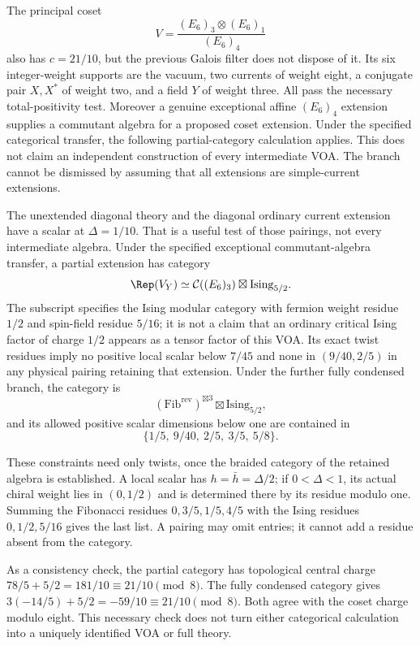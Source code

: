 The principal coset
\[
 V=\frac{(E_6)_3\otimes(E_6)_1}{(E_6)_4}
\]
also has $c=21/10$, but the previous Galois filter does not
dispose of it. Its six integer-weight supports are the vacuum,
two currents of weight eight, a conjugate pair $X,X^*$ of
weight two, and a field $Y$ of weight three. All pass the necessary
total-positivity test. Moreover a genuine exceptional affine
$(E_6)_4$ extension supplies a commutant algebra for a proposed
coset extension. Under the specified categorical transfer, the
following partial-category calculation applies. This does not
claim an independent construction of every intermediate VOA.
The branch cannot be dismissed by
assuming that all extensions are simple-current extensions.

The unextended diagonal theory and the diagonal ordinary current
extension have a scalar at $\Delta=1/10$. That is a useful test
of those pairings, not every intermediate algebra. Under the
specified exceptional commutant-algebra transfer, a partial
extension has category
\[
 \Rep(V_Y)\simeq
 \mathcal C((E_6)_3)\boxtimes\mathrm{Ising}_{5/2}.
\]
The subscript specifies the Ising modular category with fermion
weight residue $1/2$ and spin-field residue $5/16$; it is not a
claim that an ordinary critical Ising factor of charge $1/2$
appears as a tensor factor of this VOA.
Its exact twist residues imply no positive local scalar below
$7/45$ and none in $(9/40,2/5)$ in any physical pairing retaining
that extension. Under the further fully condensed branch, the
category is
\[
 (\mathrm{Fib}^{\mathrm{rev}})^{\boxtimes3}
 \boxtimes\mathrm{Ising}_{5/2},
\]
and its allowed positive scalar dimensions below one are contained
in
\[
 \{1/5,\ 9/40,\ 2/5,\ 3/5,\ 5/8\}.
\]

These constraints need only twists, once the braided category of
the retained algebra is established. A local scalar has
$h=\bar h=\Delta/2$; if $0<\Delta<1$, its actual chiral
weight lies in $(0,1/2)$ and is determined there by its residue
modulo one. Summing the Fibonacci residues
$0,3/5,1/5,4/5$ with the Ising residues $0,1/2,5/16$
gives the last list. A pairing may omit entries; it cannot add a
residue absent from the category.

As a consistency check, the partial category has topological
central charge
$78/5+5/2=181/10\equiv21/10\pmod8$.
The fully condensed category gives
$3(-14/5)+5/2=-59/10\equiv21/10\pmod8$.
Both agree with the coset charge modulo eight. This necessary
check does not turn either categorical calculation into a
uniquely identified VOA or full theory.

